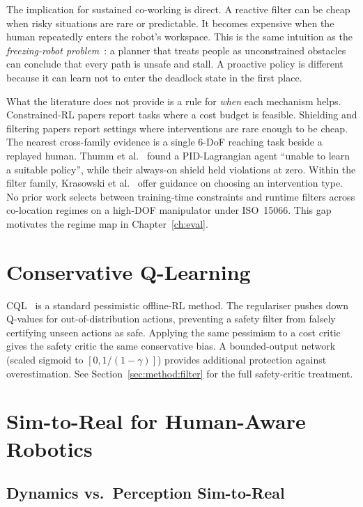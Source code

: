\documentclass[11pt,a4paper]{report}
\newcommand{\iso}{ISO~15066}
\begin{document}
The implication for sustained co-working is direct. A reactive filter
can be cheap when risky situations are rare or predictable. It becomes
expensive when the human repeatedly enters the robot's workspace. This
is the same intuition as the \emph{freezing-robot
problem}~\cite{trautman2010freezing}: a planner that treats people as
unconstrained obstacles can conclude that every path is unsafe and
stall. A proactive policy is different because it can learn not to
enter the deadlock state in the first place.

What the literature does not provide is a rule for \emph{when} each
mechanism helps. Constrained-RL papers report tasks where a cost budget
is feasible. Shielding and filtering papers report settings where
interventions are rare enough to be cheap. The nearest cross-family
evidence is a single 6-DoF reaching task beside a replayed human. Thumm
et al.~\cite{thumm2023interventions} found a PID-Lagrangian agent
``unable to learn a suitable policy'', while their always-on shield
held violations at zero. Within the filter family, Krasowski
et al.~\cite{krasowski2023provablysafe} offer guidance on choosing an
intervention type. No prior work selects between training-time
constraints and runtime filters across co-location regimes on a
high-DOF manipulator under \iso{}. This gap motivates the regime map in
Chapter~\ref{ch:eval}.

\section{Conservative Q-Learning}
\label{sec:bg:cql}

\textsc{CQL}~\cite{kumar2020cql} is a standard pessimistic
offline-RL method. The regulariser
pushes down Q-values for out-of-distribution actions, preventing a
safety filter from falsely certifying unseen actions as safe.
Applying the same pessimism to a cost critic gives the safety critic
the same conservative bias. A bounded-output network
(scaled sigmoid to $[0, 1/(1-\gamma)]$) provides additional
protection against overestimation. See
Section~\ref{sec:method:filter} for the full safety-critic
treatment.

\section{Sim-to-Real for Human-Aware Robotics}
\label{sec:bg:sim2real}

\subsection{Dynamics vs.\ Perception Sim-to-Real}
\label{sec:bg:sim2real:dyn-perc}
\end{document}
